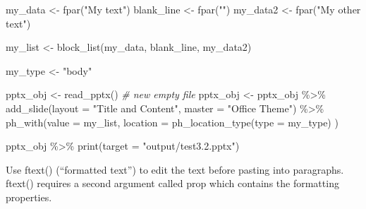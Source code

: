 \documentclass[
]{book}
\newenvironment{Shaded}{\begin{snugshade}}{\end{snugshade}}
\newcommand{\AttributeTok}[1]{\textcolor[rgb]{0.77,0.63,0.00}{#1}}
\newcommand{\CommentTok}[1]{\textcolor[rgb]{0.56,0.35,0.01}{\textit{#1}}}
\newcommand{\FunctionTok}[1]{\textcolor[rgb]{0.00,0.00,0.00}{#1}}
\newcommand{\NormalTok}[1]{#1}
\newcommand{\OtherTok}[1]{\textcolor[rgb]{0.56,0.35,0.01}{#1}}
\newcommand{\SpecialCharTok}[1]{\textcolor[rgb]{0.00,0.00,0.00}{#1}}
\newcommand{\StringTok}[1]{\textcolor[rgb]{0.31,0.60,0.02}{#1}}
\begin{document}
\begin{Shaded}
\begin{Highlighting}[]
\NormalTok{my\_data }\OtherTok{\textless{}{-}} \FunctionTok{fpar}\NormalTok{(}\StringTok{"My text"}\NormalTok{)}
\NormalTok{blank\_line }\OtherTok{\textless{}{-}} \FunctionTok{fpar}\NormalTok{(}\StringTok{""}\NormalTok{)}
\NormalTok{my\_data2 }\OtherTok{\textless{}{-}} \FunctionTok{fpar}\NormalTok{(}\StringTok{"My other text"}\NormalTok{)}

\NormalTok{my\_list }\OtherTok{\textless{}{-}} \FunctionTok{block\_list}\NormalTok{(my\_data, blank\_line, my\_data2)}

\NormalTok{my\_type }\OtherTok{\textless{}{-}} \StringTok{"body"}

\NormalTok{pptx\_obj }\OtherTok{\textless{}{-}} \FunctionTok{read\_pptx}\NormalTok{() }\CommentTok{\# new empty file}
\NormalTok{pptx\_obj }\OtherTok{\textless{}{-}}\NormalTok{ pptx\_obj }\SpecialCharTok{\%\textgreater{}\%}
  \FunctionTok{add\_slide}\NormalTok{(}\AttributeTok{layout =} \StringTok{"Title and Content"}\NormalTok{, }\AttributeTok{master =} \StringTok{"Office Theme"}\NormalTok{) }\SpecialCharTok{\%\textgreater{}\%} 
  \FunctionTok{ph\_with}\NormalTok{(}\AttributeTok{value =}\NormalTok{ my\_list, }\AttributeTok{location =} \FunctionTok{ph\_location\_type}\NormalTok{(}\AttributeTok{type =}\NormalTok{ my\_type) )}

\NormalTok{pptx\_obj }\SpecialCharTok{\%\textgreater{}\%}
  \FunctionTok{print}\NormalTok{(}\AttributeTok{target =} \StringTok{"output/test3.2.pptx"}\NormalTok{) }
\end{Highlighting}
\end{Shaded}

Use ftext() (``formatted text'') to edit the text before pasting into paragraphs. ftext() requires a second argument called prop which contains the formatting properties.
\end{document}
